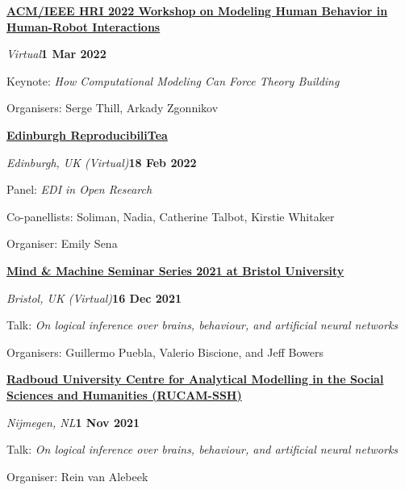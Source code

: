 \documentclass[10pt]{article}
\newenvironment{outerlist}[1][\enskip\textbullet]%
        {\begin{itemize}[#1]}{\end{itemize}%
         \vspace{-.6\baselineskip}}
\newenvironment{innerlist}[1][\enskip\textbullet]%
        {\begin{compactitem}[#1]}{\end{compactitem}}
\begin{document}
\textbf{\href{https://www.modelinghri.com/schedule}{ACM/IEEE HRI 2022 Workshop on 
Modeling Human Behavior 
in Human-Robot Interactions}} 
\begin{outerlist}
  \item[] \textit{Virtual}\hfill\textbf{1 Mar 2022}
  \begin{innerlist}
    \item Keynote: \textit{How Computational Modeling Can Force Theory Building}
    \item Organisers: Serge Thill, Arkady Zgonnikov
  \end{innerlist}
\end{outerlist}
\vspace{8pt}


\textbf{\href{https://edopenresearch.com/reproducibilitea-blog/}{ Edinburgh ReproducibiliTea}} 
\begin{outerlist}
  \item[] \textit{Edinburgh, UK (Virtual)}\hfill\textbf{18 Feb 2022}
  \begin{innerlist}
    \item Panel: \textit{EDI in Open Research}
    \item Co-panellists:  Soliman, Nadia, Catherine Talbot, Kirstie Whitaker
    \item Organiser: Emily Sena
  \end{innerlist}
\end{outerlist}
\vspace{8pt}

\textbf{\href{https://mindandmachine.blogs.bristol.ac.uk/seminars/}{Mind \& Machine Seminar Series 2021 at Bristol University}} 
\begin{outerlist}
  \item[] \textit{Bristol, UK (Virtual)}\hfill\textbf{16 Dec 2021}
  \begin{innerlist}
    \item Talk: \textit{On logical inference over brains, behaviour, and artificial neural networks}
    \item Organisers: Guillermo Puebla, Valerio Biscione, and Jeff Bowers
  \end{innerlist}
\end{outerlist}
\vspace{8pt}

\textbf{\href{https://www.ru.nl/nsm/imr/research-facilities/research-centres/vm/rucam-ssh/}{Radboud University Centre for Analytical Modelling in the Social Sciences and Humanities (RUCAM-SSH)}} 
\begin{outerlist}
  \item[] \textit{Nijmegen, NL}\hfill\textbf{1 Nov 2021}
  \begin{innerlist}
    \item Talk: \textit{On logical inference over brains, behaviour, and artificial neural networks}
    \item Organiser: Rein van Alebeek
  \end{innerlist}
\end{outerlist}
\vspace{8pt}
\end{document}
